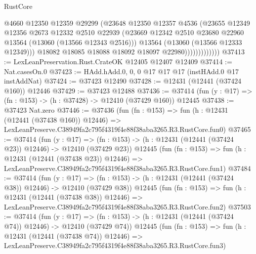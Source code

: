 \begin{lexlean}{RustCore}
\begin{coremodule}
                            @4660
                            @12350
                            @12359
                            @29299
                            (@23648
                              @12350
                              @12357
                              @4536
                              (@23655
                                @12349
                                @12356
                                @2673
                                @12332
                                @2510
                                @22939
                                (@23669
                                  @12342
                                  @2510
                                  @23680
                                  @22960
                                  @13564
                                  (@13060 (@13566 @12343 @2516)))
                                @13564
                                (@13060 (@13566 @12333 @12349)))
                              @18082
                              @18085
                              @18088
                              @18092
                              @18097
                              @22980)))))))))))))
@37413 := LexLeanPreservation.Rust.CrateOK @12405 @12407 @12409
@37414 := Nat.casesOn.{0}
@37423 := HAdd.hAdd.{0, 0, 0} @17 @17 @17 (instHAdd.{0} @17 instAddNat)
@37424 := @37423 @12490
@37428 := @12431 (@12441 (@37424 @160)) @12446
@37429 := @37423 @12488
@37436 := @37414 (fun (y : @17) => (fn : @153) -> (h : @37428) -> @12410 (@37429 @160)) @12445
@37438 := @37423 Nat.zero
@37446 := @37436
    (fun (fn : @153) =>
    fun (h : @12431 (@12441 (@37438 @160)) @12446) =>
    LexLeanPreserve.C38949fa2c795f4319f4e88f38aba3265.R3.RustCore.fun0)
@37465 := @37414
    (fun (y : @17) =>
    (fn : @153) -> (h : @12431 (@12441 (@37424 @23)) @12446) -> @12410 (@37429 @23))
    @12445
    (fun (fn : @153) =>
    fun (h : @12431 (@12441 (@37438 @23)) @12446) =>
    LexLeanPreserve.C38949fa2c795f4319f4e88f38aba3265.R3.RustCore.fun1)
@37484 := @37414
    (fun (y : @17) =>
    (fn : @153) -> (h : @12431 (@12441 (@37424 @38)) @12446) -> @12410 (@37429 @38))
    @12445
    (fun (fn : @153) =>
    fun (h : @12431 (@12441 (@37438 @38)) @12446) =>
    LexLeanPreserve.C38949fa2c795f4319f4e88f38aba3265.R3.RustCore.fun2)
@37503 := @37414
    (fun (y : @17) =>
    (fn : @153) -> (h : @12431 (@12441 (@37424 @74)) @12446) -> @12410 (@37429 @74))
    @12445
    (fun (fn : @153) =>
    fun (h : @12431 (@12441 (@37438 @74)) @12446) =>
    LexLeanPreserve.C38949fa2c795f4319f4e88f38aba3265.R3.RustCore.fun3)

\end{coremodule}
\end{lexlean}
